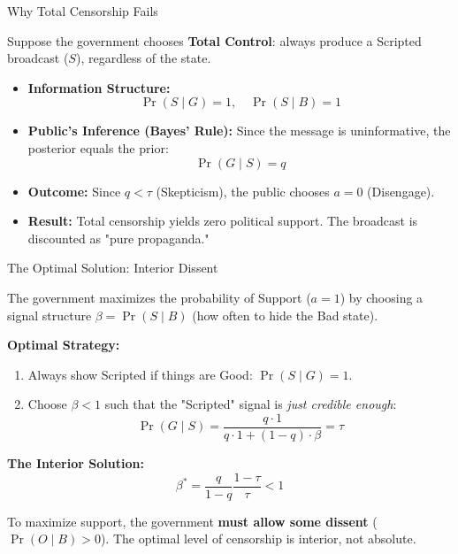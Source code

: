 \documentclass[10pt,aspectratio=169]{beamer}
\begin{document}
\begin{frame}{Why Total Censorship Fails}

Suppose the government chooses \textbf{Total Control}: always produce a Scripted broadcast ($S$), regardless of the state.

\vspace{0.3cm}

\begin{itemize}
    \item \textbf{Information Structure:}
    \[ \Pr(S \mid G) = 1, \quad \Pr(S \mid B) = 1 \]
    
    \item \textbf{Public's Inference (Bayes' Rule):}
    Since the message is uninformative, the posterior equals the prior:
    \[ \Pr(G \mid S) = q \]
    
    \item \textbf{Outcome:}
    Since $q < \tau$ (Skepticism), the public chooses $a=0$ (Disengage).
    
    \item \textbf{Result:} 
    \alert{Total censorship yields zero political support.} The broadcast is discounted as "pure propaganda."
\end{itemize}

\end{frame}

\begin{frame}{The Optimal Solution: Interior Dissent}

The government maximizes the probability of Support ($a=1$) by choosing a signal structure $\beta = \Pr(S \mid B)$ (how often to hide the Bad state).

\vspace{0.2cm}

\textbf{Optimal Strategy:}
\begin{enumerate}
    \item Always show Scripted if things are Good: $\Pr(S \mid G) = 1$.
    \item Choose $\beta < 1$ such that the "Scripted" signal is \textit{just credible enough}:
    \[ \Pr(G \mid S) = \frac{q \cdot 1}{q \cdot 1 + (1-q) \cdot \beta} = \tau \]
\end{enumerate}

\vspace{0.2cm}
\textbf{The Interior Solution:}
\[ \beta^* = \frac{q}{1-q} \frac{1-\tau}{\tau} < 1 \]

\vspace{0.2cm}
 To maximize support, the government \textbf{must allow some dissent} ($\Pr(O \mid B) > 0$). The optimal level of censorship is interior, not absolute.


\centering
\hyperlink{preview}{}

\end{frame}
\end{document}

